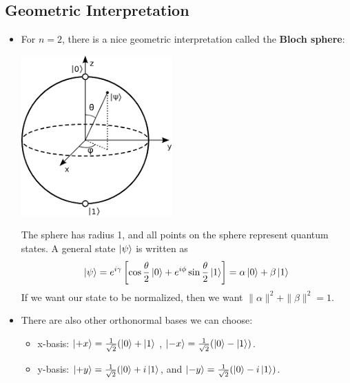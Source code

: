 \subsection{Geometric Interpretation}
\begin{itemize}
	\item For \( n = 2 \), there is a nice geometric interpretation called the \textbf{Bloch sphere}:
		\begin{center}
			\includegraphics[scale=0.8]{bloch-sphere.png}
		\end{center}
		The sphere has radius 1, and all points on the sphere represent quantum states. A general state 
		\( \ket{\psi} \) is written as 
		\[
		\ket{\psi} = e^{i\gamma}\left[ \cos \frac{\theta}{2}\ket{0} + e^{i\phi}\sin \frac{\theta}{2}\ket{1} \right] = 
		\alpha\ket{0} + \beta\ket{1}
		\] 
		If we want our state to be normalized, then we want \( \|\alpha\|^2 + \|\beta\|^2 = 1 \).  
	\item There are also other orthonormal bases we can choose:
		\begin{itemize}
			\item x-basis: \( \ket{+x} = \frac{1}{\sqrt{2} }(\ket{0} + \ket{1} \) , \( \ket{-x} = \frac{1}{\sqrt{2} }
				(\ket{0} - \ket{1})\). 
			\item y-basis: \( \ket{+y}= \frac{1}{\sqrt{2} }(\ket{0} + i\ket{1} \), and \( \ket{-y} = 
				\frac{1}{\sqrt{2} }(\ket{0} - i\ket{1})\).
		\end{itemize}
\end{itemize}
